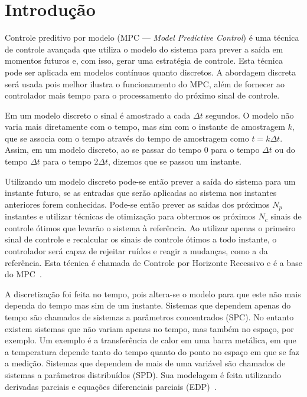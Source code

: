 
\chapter{Introdução}%
\label{chp:introducao}

Controle preditivo por modelo (\ac{MPC} --- \textit{Model Predictive Control}) é
uma técnica de controle avançada que utiliza o modelo do sistema para prever a
saída em momentos futuros e, com isso, gerar uma estratégia de controle. Esta
técnica pode ser aplicada em modelos contínuos quanto discretos. A abordagem
discreta será usada pois melhor ilustra o funcionamento do \ac{MPC}, além de
fornecer ao controlador mais tempo para o processamento do próximo sinal de
controle.

Em um modelo discreto o sinal é amostrado a cada \( \Delta{}t \) segundos. O
modelo não varia mais diretamente com o tempo, mas sim com o instante de
amostragem \( k \), que se associa com o tempo através do tempo de amostragem
como \( t = k\Delta{}t \). Assim, em um modelo discreto, ao se passar do tempo
\( 0 \) para o tempo \( \Delta{}t \) ou do tempo \( \Delta{}t \) para o tempo
\( 2\Delta{}t \), dizemos que se passou um instante.

Utilizando um modelo discreto pode-se então prever a saída do sistema para um
instante futuro, se as entradas que serão aplicadas ao sistema nos instantes
anteriores forem conhecidas. Pode-se então prever as saídas dos próximos \(N_p\)
instantes e utilizar técnicas de otimização para obtermos os próximos \(N_c\)
sinais de controle ótimos que levarão o sistema à referência. Ao utilizar apenas
o primeiro sinal de controle e recalcular os sinais de controle ótimos a todo
instante, o controlador será capaz de rejeitar ruídos e reagir a mudanças, como
a da referência. Esta técnica é chamada de Controle por Horizonte Recessivo e é
a base do \ac{MPC}~\cite{book:wang}.

A discretização foi feita no tempo, pois altera-se o modelo para que este não
mais dependa do tempo mas sim de um instante. Sistemas que dependem apenas do
tempo são chamados de sistemas a parâmetros concentrados (\ac{SPC}). No entanto
existem sistemas que não variam apenas no tempo, mas também no espaço, por
exemplo. Um exemplo é a transferência de calor em uma barra metálica, em que a
temperatura depende tanto do tempo quanto do ponto no espaço em que se faz a
medição. Sistemas que dependem de mais de uma variável são chamados de sistemas
a parâmetros distribuídos (\ac{SPD}). Sua modelagem é feita utilizando derivadas
parciais e equações diferenciais parciais (\ac{EDP})~\cite{masterthesis:nelson}.

